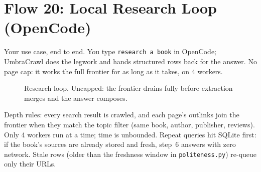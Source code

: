 \documentclass[11pt,a4paper]{article}
\begin{document}
\section{Flow 20: Local Research Loop (OpenCode)}
Your use case, end to end. You type \texttt{research a book} in OpenCode; UmbraCrawl does the legwork and hands structured rows back for the answer. No page cap: it works the full frontier for as long as it takes, on 4 workers.

\begin{figure}[H]
\centering
{}
\caption{Research loop. Uncapped: the frontier drains fully before extraction merges and the answer composes.}
\label{fig:research}
\end{figure}

Depth rules: every search result is crawled, and each page's outlinks join the frontier when they match the topic filter (same book, author, publisher, reviews). Only 4 workers run at a time; time is unbounded. Repeat queries hit SQLite first: if the book's sources are already stored and fresh, step~6 answers with zero network. Stale rows (older than the freshness window in \texttt{politeness.py}) re-queue only their URLs.
\end{document}
